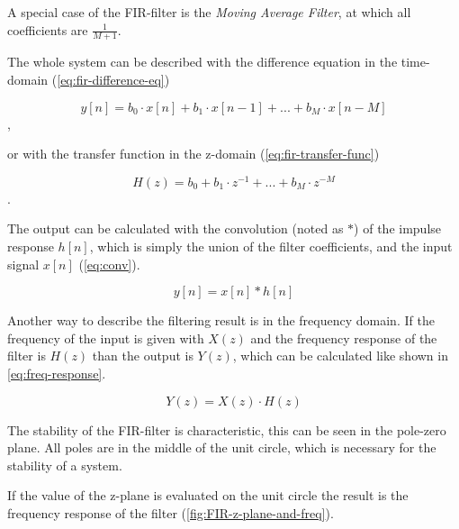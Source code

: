 A special case of the \ac{FIR}-filter is the \textit{Moving Average Filter}, at which all coefficients are $\frac{1}{M+1}$.

The whole system can be described with the difference equation in the time-domain (\autoref{eq:fir-difference-eq})

\begin{equation}
    y[n] = b_0 \cdot x[n] + b_1 \cdot x[n-1] + ... + b_M \cdot x[n-M]
    \label{eq:fir-difference-eq}
\end{equation},

or with the transfer function in the z-domain (\autoref{eq:fir-transfer-func})

\begin{equation}
    H(z) = b_0 + b_1 \cdot z^{-1} + ... + b_M \cdot z^{-M}
    \label{eq:fir-transfer-func}
\end{equation}.

The output can be calculated with the convolution (noted as $*$) of the impulse response $h[n]$, which is simply the
union of the filter coefficients, and the input signal $x[n]$ (\autoref{eq:conv}).

\begin{equation}
    y[n] = x[n] * h[n]
    \label{eq:conv}
\end{equation}

Another way to describe the filtering result is in the frequency domain.
If the frequency of the input is given with $X(z)$ and the frequency response of the filter is $H(z)$
than the output is $Y(z)$, which can be calculated like shown in \autoref{eq:freq-response}.

\begin{equation}
    Y(z) = X(z) \cdot H(z)
    \label{eq:freq-response}
\end{equation}

The stability of the \ac{FIR}-filter is characteristic, this can be seen in the pole-zero plane. All poles are in
the middle of the unit circle, which is necessary for the stability of a system.

If the value of the z-plane is evaluated on the unit circle the result is the frequency response of the filter
(\autoref{fig:FIR-z-plane-and-freq}).

